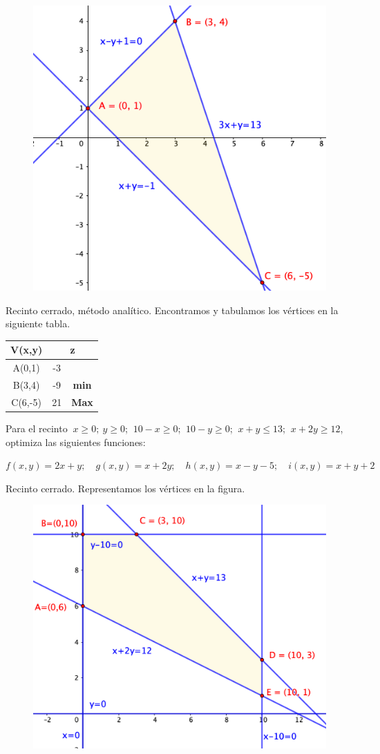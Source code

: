 \begin{multicols}{2}
	\begin{figure}[H]
	\centering
	\includegraphics[width=.45\textwidth]{imagenes/img31.png}
\end{figure}	
Recinto cerrado, método analítico.
Encontramos y tabulamos los vértices en la siguiente tabla.

\begin{table}[H]
\centering
\begin{tabular}{c|cc}
\textbf{V(x,y)} & \multicolumn{2}{c}{\textbf{z}} \\ \hline
A(0,1)          & -3        &                    \\
B(3,4)          & -9        & \textbf{min}       \\
C(6,-5)         & 21        & \textbf{Max}      
\end{tabular}
\end{table}
\end{multicols}


\vspace{10mm}
\begin{ejemplo}
\begin{ejer}
	Para el recinto $\ x\ge 0;\ y\ge 0$; $\ 10-x\ge 0$; $\ 10-y\ge 0$; $\ x+y\le 13$; $\ x+2y\ge 12$, optimiza las siguientes funciones:
	
$f(x,y)=2x+y;\quad g(x,y)=x+2y;\quad h(x,y)=x-y-5;\quad i(x,y)=x+y+2$	
\end{ejer}	
\end{ejemplo}
\vspace{5mm}
Recinto cerrado. Representamos los vértices en la figura.

\begin{figure}[H]
	\centering
	\includegraphics[width=.75\textwidth]{imagenes/img32.png}
\end{figure}

